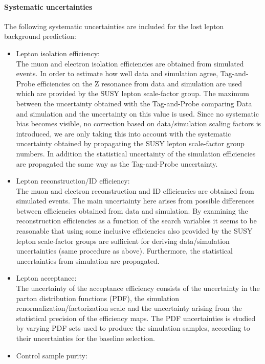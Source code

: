 \paragraph{Systematic uncertainties}

The following systematic uncertainties are included for the lost lepton background prediction:

\begin{itemize}
\item Lepton isolation efficiency:\\
  The muon and electron isolation efficiencies are obtained from simulated events. In order to estimate how well data and simulation agree, Tag-and-Probe efficiencies on the Z resonance from data and simulation are used which are provided by the SUSY lepton scale-factor group. The maximum between the uncertainty obtained with the Tag-and-Probe comparing Data and simulation and the uncertainty on this value is used.
  Since no systematic bias becomes visible,
  no correction based on data/simulation scaling factors is introduced, we are only taking this into account with the systematic uncertainty obtained by propagating the SUSY lepton scale-factor group numbers.
  In addition the statistical uncertainty of the simulation efficiencies are
  propagated the same way as the Tag-and-Probe uncertainty.
  \item Lepton reconstruction/ID efficiency:\\
  The muon and electron reconstruction and ID efficiencies are obtained from simulated events. The main uncertainty here arises
  from possible differences between efficiencies obtained from data and simulation. By examining the reconstruction efficiencies as a function of the search variables it seems to be reasonable that using some inclusive efficiencies also provided by the SUSY lepton scale-factor groups are sufficient for deriving data/simulation uncertainties (same procedure as above). Furthermore, the statistical uncertainties from simulation are propagated.
\item Lepton acceptance:\\
  The uncertainty of the acceptance efficiency consists of the uncertainty
  in the parton distribution functions (PDF), the simulation renormalization/factorization scale
  and the uncertainty arising from the statistical precision of the efficiency maps.
  The PDF uncertainties is studied by varying PDF sets used to produce the
  simulation samples, according to their uncertainties for the baseline selection.
\item Control sample purity:\\

\end{itemize}
